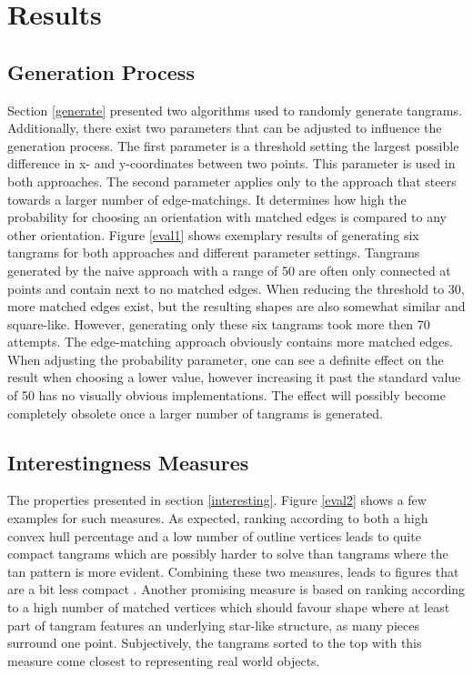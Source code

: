 \chapter{Results}\label{chapter:results}

\section{Generation Process}

Section \ref{generate} presented two algorithms used to randomly generate tangrams. Additionally, there exist two parameters that can be adjusted to influence the generation process. The first parameter is a threshold setting the largest possible difference in x- and y-coordinates between two points. This parameter is used in both approaches. The second parameter applies only to the approach that steers towards a larger number of edge-matchings. It determines how high the probability for choosing an orientation with matched edges is compared to any other orientation. Figure \ref{eval1} shows exemplary results of generating six tangrams for both approaches and different parameter settings. Tangrams generated by the naive approach with a range of 50 are often only connected at points and contain next to no matched edges. When reducing the threshold to 30, more matched edges exist, but the resulting shapes are also somewhat similar and square-like. However, generating only these six tangrams took more then 70 attempts. The edge-matching approach obviously contains more matched edges. When adjusting the probability parameter, one can see a definite effect on the result when choosing a lower value, however increasing it past the standard value of 50 has no visually obvious implementations. The effect will possibly become completely obsolete once a larger number of tangrams is generated. 



\section{Interestingness Measures}

The properties presented in section \ref{interesting}. Figure \ref{eval2} shows a few examples for such measures. As expected, ranking according to both a high convex hull percentage and a low number of outline vertices leads to quite compact tangrams which are possibly harder to solve than tangrams where the tan pattern is more evident. Combining these two measures, leads to figures that are a bit less compact . Another promising measure is based on ranking according to a high number of matched vertices which should favour shape where at least part of tangram features an underlying star-like structure, as many pieces surround one point. Subjectively, the tangrams sorted to the top with this measure come closest to representing real world objects. 

